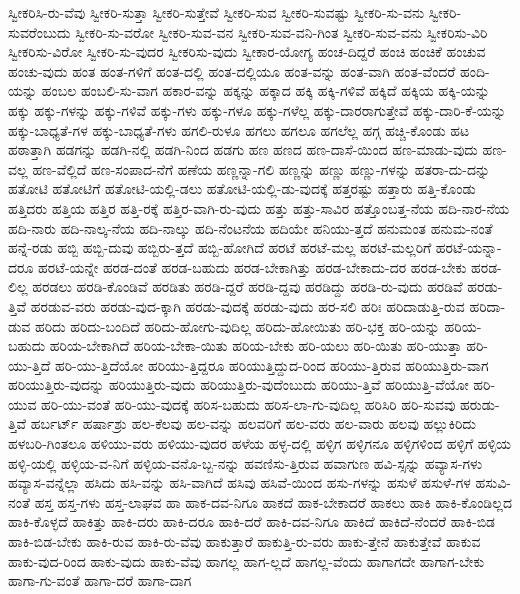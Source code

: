 {ಸ್ವೀಕರಿಸಿ-ರು-ವೆವು
ಸ್ವೀಕರಿ-ಸುತ್ತಾ
ಸ್ವೀಕರಿ-ಸುತ್ತೇವೆ
ಸ್ವೀಕರಿ-ಸುವ
ಸ್ವೀಕರಿ-ಸುವಷ್ಟು
ಸ್ವೀಕರಿ-ಸು-ವನು
ಸ್ವೀಕರಿ-ಸುವರೆಂಬುದು
ಸ್ವೀಕರಿ-ಸು-ವರೋ
ಸ್ವೀಕರಿ-ಸುವ-ವನ
ಸ್ವೀಕರಿ-ಸುವ-ವನಿ-ಗಿಂತ
ಸ್ವೀಕರಿ-ಸುವ-ವನು
ಸ್ವೀಕರಿಸು-ವಿರಿ
ಸ್ವೀಕರಿಸು-ವಿರೋ
ಸ್ವೀಕರಿ-ಸು-ವುದರ
ಸ್ವೀಕರಿಸು-ವುದು
ಸ್ವೀಕಾರ-ಯೋಗ್ಯ
ಹಂಚ-ದಿದ್ದರೆ
ಹಂಚಿ
ಹಂಚಿಕೆ
ಹಂಚುವ
ಹಂಚು-ವುದು
ಹಂತ
ಹಂತ-ಗಳಿಗೆ
ಹಂತ-ದಲ್ಲಿ
ಹಂತ-ದಲ್ಲಿಯೂ
ಹಂತ-ವನ್ನು
ಹಂತ-ವಾಗಿ
ಹಂತ-ವೆಂದರೆ
ಹಂದಿ-ಯನ್ನು
ಹಂಬಲ
ಹಂಬಲಿ-ಸು-ವಾಗ
ಹಕಾರ-ವನ್ನು
ಹಕ್ಕನ್ನು
ಹಕ್ಕಾದ
ಹಕ್ಕಿ
ಹಕ್ಕಿ-ಗಳಿವೆ
ಹಕ್ಕಿದೆ
ಹಕ್ಕಿಯ
ಹಕ್ಕಿ-ಯನ್ನು
ಹಕ್ಕು
ಹಕ್ಕು-ಗಳನ್ನು
ಹಕ್ಕು-ಗಳಿವೆ
ಹಕ್ಕು-ಗಳು
ಹಕ್ಕು-ಗಳೂ
ಹಕ್ಕು-ಗಳೆಲ್ಲ
ಹಕ್ಕು-ದಾರರಾಗುತ್ತೇವೆ
ಹಕ್ಕು-ದಾರಿ-ಕೆ-ಯನ್ನು
ಹಕ್ಕು-ಬಾಧ್ಯತೆ-ಗಳ
ಹಕ್ಕು-ಬಾಧ್ಯತೆ-ಗಳು
ಹಗಲಿ-ರುಳೂ
ಹಗಲು
ಹಗಲೂ
ಹಗಲೆಲ್ಲ
ಹಗ್ಗ
ಹಚ್ಚಿ-ಕೊಂಡು
ಹಟ
ಹಠಾತ್ತಾಗಿ
ಹಡಗನ್ನು
ಹಡಗಿ-ನಲ್ಲಿ
ಹಡಗಿ-ನಿಂದ
ಹಡಗು
ಹಣ
ಹಣದ
ಹಣ-ದಾಸೆ-ಯಿಂದ
ಹಣ-ಮಾಡು-ವುದು
ಹಣ-ವಲ್ಲ
ಹಣ-ವೆಲ್ಲಿದೆ
ಹಣ-ಸಂಪಾದ-ನೆಗೆ
ಹಣೆಯ
ಹಣ್ಣನ್ನಾ-ಗಲಿ
ಹಣ್ಣನ್ನು
ಹಣ್ಣು
ಹಣ್ಣು-ಗಳನ್ನು
ಹತರಾ-ದು-ದನ್ನು
ಹತೋಟಿ
ಹತೋಟಿಗೆ
ಹತೋಟಿ-ಯಲ್ಲಿ-ಡಲು
ಹತೋಟಿ-ಯಲ್ಲಿ-ಡು-ವುದಕ್ಕೆ
ಹತ್ತರಷ್ಟು
ಹತ್ತಾರು
ಹತ್ತಿ-ಕೊಂಡು
ಹತ್ತಿದರು
ಹತ್ತಿಯ
ಹತ್ತಿರ
ಹತ್ತಿ-ರಕ್ಕೆ
ಹತ್ತಿರ-ವಾಗಿ-ರು-ವುದು
ಹತ್ತು
ಹತ್ತು-ಸಾವಿರ
ಹತ್ತೊಂಬತ್ತ-ನೆಯ
ಹದಿ-ನಾರ-ನೆಯ
ಹದಿ-ನಾರು
ಹದಿ-ನಾಲ್ಕ-ನೆಯ
ಹದಿ-ನಾಲ್ಕು
ಹದಿ-ನೆಂಟನೆಯ
ಹದಿಯೇ
ಹನಿಯು-ತ್ತದೆ
ಹನುಮಂತ
ಹನುಮ-ನಂತೆ
ಹನ್ನೆ-ರಡು
ಹಬ್ಬಿ
ಹಬ್ಬಿ-ದುವು
ಹಬ್ಬಿರು-ತ್ತದೆ
ಹಬ್ಬಿ-ಹೋಗಿದೆ
ಹರಟೆ
ಹರಟೆ-ಮಲ್ಲ
ಹರಟೆ-ಮಲ್ಲರಿಗೆ
ಹರಟೆ-ಯನ್ನಾ-ದರೂ
ಹರಟೆ-ಯನ್ನೇ
ಹರಡ-ದಂತೆ
ಹರಡ-ಬಹುದು
ಹರಡ-ಬೇಕಾಗಿತ್ತು
ಹರಡ-ಬೇಕಾದು-ದರ
ಹರಡ-ಬೇಕು
ಹರಡ-ಲಿಲ್ಲ
ಹರಡಲು
ಹರಡಿ-ಕೊಂಡಿವೆ
ಹರಡಿತು
ಹರಡಿ-ದ್ದರೆ
ಹರಡಿ-ದ್ದವು
ಹರಡಿದ್ದು
ಹರಡಿ-ರು-ವುದು
ಹರಡಿವೆ
ಹರಡು-ತ್ತಿವೆ
ಹರಡುವ-ವರು
ಹರಡು-ವುದ-ಕ್ಕಾಗಿ
ಹರಡು-ವುದಕ್ಕೆ
ಹರಡು-ವುದು
ಹರ-ಸಲಿ
ಹರಿಃ
ಹರಿದಾಡುತ್ತಿ-ರುವ
ಹರಿದಾ-ಡುವ
ಹರಿದು
ಹರಿದು-ಬಂದಿದೆ
ಹರಿದು-ಹೋಗು-ವುದಿಲ್ಲ
ಹರಿದು-ಹೋಯಿತು
ಹರಿ-ಭಕ್ತ
ಹರಿ-ಯನ್ನು
ಹರಿಯ-ಬಹುದು
ಹರಿಯ-ಬೇಕಾಗಿದೆ
ಹರಿಯ-ಬೇಕಾ-ಯಿತು
ಹರಿಯ-ಬೇಕು
ಹರಿ-ಯಲು
ಹರಿ-ಯಿತು
ಹರಿ-ಯುತ್ತಾ
ಹರಿ-ಯು-ತ್ತಿದೆ
ಹರಿ-ಯು-ತ್ತಿದೆಯೋ
ಹರಿಯು-ತ್ತಿದ್ದರೂ
ಹರಿಯುತ್ತಿದ್ದುದ-ರಿಂದ
ಹರಿಯು-ತ್ತಿರುವ
ಹರಿಯುತ್ತಿರು-ವಾಗ
ಹರಿಯುತ್ತಿರು-ವುದನ್ನು
ಹರಿಯುತ್ತಿರು-ವುದು
ಹರಿಯುತ್ತಿರು-ವುದೆಂಬುದು
ಹರಿಯು-ತ್ತಿವೆ
ಹರಿಯುತ್ತಿ-ವೆಯೋ
ಹರಿ-ಯುವ
ಹರಿ-ಯು-ವಂತೆ
ಹರಿ-ಯು-ವುದಕ್ಕೆ
ಹರಿಸ-ಬಹುದು
ಹರಿಸ-ಲಾ-ಗು-ವುದಿಲ್ಲ
ಹರಿಸಿರಿ
ಹರಿ-ಸುವವು
ಹರುಡು-ತ್ತಿವೆ
ಹರ್ಬರ್ಟ್
ಹರ್ಷಾಶ್ರು
ಹಲ-ಕೆಲವು
ಹಲ-ವನ್ನು
ಹಲವರಿಗೆ
ಹಲ-ವರು
ಹಲ-ವಾರು
ಹಲವು
ಹಲ್ಲುಕಿರಿದು
ಹಳಬರಿ-ಗಿಂತಲೂ
ಹಳಿಯು-ವರು
ಹಳಿಯು-ವುದರ
ಹಳೆಯ
ಹಳ್ಳ-ದಲ್ಲಿ
ಹಳ್ಳಿಗ
ಹಳ್ಳಿಗನೂ
ಹಳ್ಳಿಗಳಿಂದ
ಹಳ್ಳಿಗೆ
ಹಳ್ಳಿಯ
ಹಳ್ಳಿ-ಯಲ್ಲಿ
ಹಳ್ಳಿಯ-ವ-ನಿಗೆ
ಹಳ್ಳಿಯ-ವನೊ-ಬ್ಬ-ನನ್ನು
ಹವಣಿಸು-ತ್ತಿರುವ
ಹವಾಗುಣ
ಹವಿ-ಸ್ಸನ್ನು
ಹವ್ಯಾಸ-ಗಳು
ಹವ್ಯಾಸ-ವನ್ನೆಲ್ಲಾ
ಹಸಿದು
ಹಸಿ-ವನ್ನು
ಹಸಿ-ವಾಗಿದೆ
ಹಸಿವು
ಹಸಿವೆ-ಯಿಂದ
ಹಸು-ಗಳನ್ನು
ಹಸುಳೆ
ಹಸುಳೆ-ಗಳ
ಹಸುವಿ-ನಂತೆ
ಹಸ್ತ
ಹಸ್ತ-ಗಳು
ಹಸ್ತ-ಲಾಘವ
ಹಾ
ಹಾಕ-ದವ-ನಿಗೂ
ಹಾಕದೆ
ಹಾಕ-ಬೇಕಾದರೆ
ಹಾಕಲು
ಹಾಕಿ
ಹಾಕಿ-ಕೊಂಡಿಲ್ಲದ
ಹಾಕಿ-ಕೊಳ್ಳದೆ
ಹಾಕಿತ್ತು
ಹಾಕಿ-ದರು
ಹಾಕಿ-ದರೂ
ಹಾಕಿ-ದರೆ
ಹಾಕಿ-ದವ-ನಿಗೂ
ಹಾಕಿದೆ
ಹಾಕಿದೆ-ನೆಂದರೆ
ಹಾಕಿ-ಬಿಡ
ಹಾಕಿ-ಬಿಡ-ಬೇಕು
ಹಾಕಿ-ರುವ
ಹಾಕಿ-ರು-ವೆವು
ಹಾಕುತ್ತಾರೆ
ಹಾಕುತ್ತಿ-ರು-ವರು
ಹಾಕು-ತ್ತೇನೆ
ಹಾಕುತ್ತೇವೆ
ಹಾಕುವ
ಹಾಕು-ವುದ-ರಿಂದ
ಹಾಕು-ವುದು
ಹಾಕು-ವೆವು
ಹಾಗಲ್ಲ
ಹಾಗ-ಲ್ಲದೆ
ಹಾಗಲ್ಲ-ವೆಂದು
ಹಾಗಾಗದೇ
ಹಾಗಾಗ-ಬೇಕು
ಹಾಗಾ-ಗು-ವಂತೆ
ಹಾಗಾ-ದರೆ
ಹಾಗಾ-ದಾಗ
}
